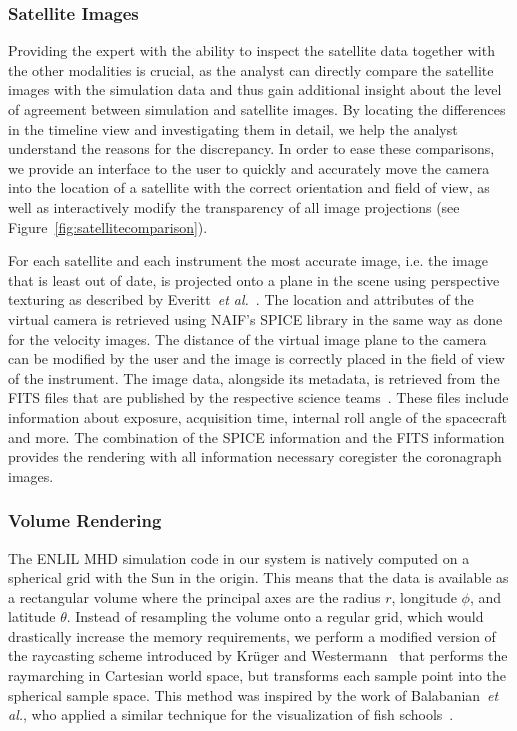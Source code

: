 \documentclass[journal]{vgtc}                %
\def\etal{\textit{et al.}}
\begin{document}
\subsubsection{Satellite Images} \label{sec:satelltes}
Providing the expert with the ability to inspect the satellite data together with the other modalities is crucial, as the analyst can directly compare the satellite images with the simulation data and thus gain additional insight about the level of agreement between simulation and satellite images. By locating the differences in the timeline view and investigating them in detail, we help the analyst understand the reasons for the discrepancy. In order to ease these comparisons, we provide an interface to the user to quickly and accurately move the camera into the location of a satellite with the correct orientation and field of view, as well as interactively modify the transparency of all image projections (see Figure~\ref{fig:satellitecomparison}).

For each satellite and each instrument the most accurate image, i.e. the image that is least out of date, is projected onto a plane in the scene using perspective texturing as described by Everitt~\etal~\cite{Everitt:2001tg}. The location and attributes of the virtual camera is retrieved using NAIF's SPICE library in the same way as done for the velocity images. The distance of the virtual image plane to the camera can be modified by the user and the image is correctly placed in the field of view of the instrument. The image data, alongside its metadata, is retrieved from the FITS files that are published by the respective science teams~\cite{wells1981fits}. These files include information about exposure, acquisition time, internal roll angle of the spacecraft and more. The combination of the SPICE information and the FITS information provides the rendering with all information necessary coregister the coronagraph images.

\subsubsection{Volume Rendering} \label{sec:volumerendering}
The ENLIL MHD simulation code in our system is natively computed on a spherical grid with the Sun in the origin. This means that the data is available as a rectangular volume where the principal axes are the radius $r$, longitude $\phi$, and latitude $\theta$. Instead of resampling the volume onto a regular grid, which would drastically increase the memory requirements, we perform a modified version of the raycasting scheme introduced by Kr\"uger and Westermann~\cite{Kruger:2003ge} that performs the raymarching in Cartesian world space, but transforms each sample point into the spherical sample space. This method was inspired by the work of Balabanian~\etal , who applied a similar technique for the visualization of fish schools~\cite{balabanian-2007-ant}.
\end{document}
